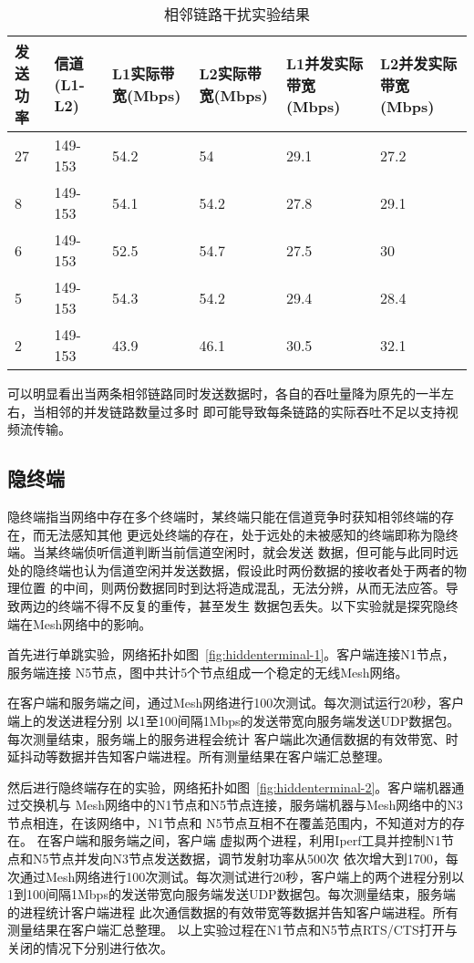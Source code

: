 \begin{table}[htbp]
  \centering
  \caption{相邻链路干扰实验结果}
  \label{tab:interference}
  \begin{tabular}{p{2cm}p{2cm}p{2cm}p{2cm}p{2cm}p{2cm}}
  \hline
  发送功率 & 信道(L1-L2) & L1实际带宽(Mbps) & L2实际带宽(Mbps) & L1并发实际带宽(Mbps) & L2并发实际带宽(Mbps) \\
  \hline
  27 &  149-153 & 54.2 & 54 & 29.1 & 27.2 \\
  8 &  149-153 & 54.1 & 54.2 & 27.8 & 29.1 \\
  6 &  149-153 & 52.5 & 54.7 & 27.5 & 30 \\
  5 &  149-153 & 54.3 & 54.2 & 29.4 & 28.4 \\
  2 &  149-153 & 43.9 & 46.1 & 30.5 & 32.1 \\
  \hline
  \end{tabular}
\end{table}

可以明显看出当两条相邻链路同时发送数据时，各自的吞吐量降为原先的一半左右，当相邻的并发链路数量过多时
即可能导致每条链路的实际吞吐不足以支持视频流传输。

\subsection{隐终端}
隐终端指当网络中存在多个终端时，某终端只能在信道竞争时获知相邻终端的存在，而无法感知其他
更远处终端的存在，处于远处的未被感知的终端即称为隐终端。当某终端侦听信道判断当前信道空闲时，就会发送
数据，但可能与此同时远处的隐终端也认为信道空闲并发送数据，假设此时两份数据的接收者处于两者的物理位置
的中间，则两份数据同时到达将造成混乱，无法分辨，从而无法应答。导致两边的终端不得不反复的重传，甚至发生
数据包丢失。以下实验就是探究隐终端在Mesh网络中的影响。

首先进行单跳实验，网络拓扑如图~\ref{fig:hiddenterminal-1}。客户端连接N1节点，服务端连接
N5节点，图中共计5个节点组成一个稳定的无线Mesh网络。

在客户端和服务端之间，通过Mesh网络进行100次测试。每次测试运行20秒，客户端上的发送进程分别
以1至100间隔1Mbps的发送带宽向服务端发送UDP数据包。每次测量结束，服务端上的服务进程会统计
客户端此次通信数据的有效带宽、时延抖动等数据并告知客户端进程。所有测量结果在客户端汇总整理。

然后进行隐终端存在的实验，网络拓扑如图~\ref{fig:hiddenterminal-2}。客户端机器通过交换机与
Mesh网络中的N1节点和N5节点连接，服务端机器与Mesh网络中的N3节点相连，在该网络中，N1节点和
N5节点互相不在覆盖范围内，不知道对方的存在。
在客户端和服务端之间，客户端
虚拟两个进程，利用Iperf工具并控制N1节点和N5节点并发向N3节点发送数据，调节发射功率从500次
依次增大到1700，每次通过Mesh网络进行100次测试。每次测试进行20秒，客户端上的两个进程分别以
1到100间隔1Mbps的发送带宽向服务端发送UDP数据包。每次测量结束，服务端的进程统计客户端进程
此次通信数据的有效带宽等数据并告知客户端进程。所有测量结果在客户端汇总整理。
以上实验过程在N1节点和N5节点RTS/CTS打开与关闭的情况下分别进行依次。


